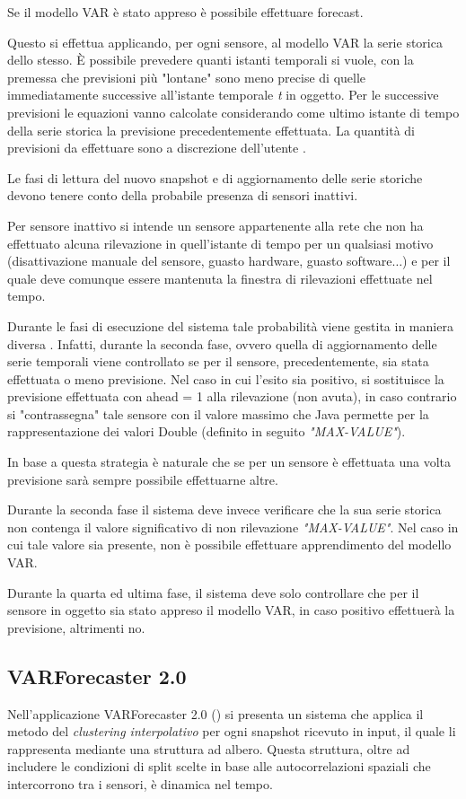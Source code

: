 \documentclass[12pt,a4paper,twoside,openright]{book}
\begin{document}
Se il modello VAR è stato appreso è possibile effettuare forecast.

Questo si effettua applicando, per ogni sensore, al modello VAR la serie storica dello stesso. È possibile prevedere quanti istanti temporali si vuole, con la premessa che previsioni più "lontane" sono meno precise di quelle immediatamente successive all'istante temporale \textit{t} in oggetto. Per le successive previsioni le equazioni vanno calcolate considerando come ultimo istante di tempo della serie storica la previsione precedentemente effettuata. La quantità di previsioni da effettuare sono a discrezione dell'utente \cite{donato}.

Le fasi di lettura del nuovo snapshot e di aggiornamento delle serie storiche devono tenere conto della probabile presenza di sensori inattivi. 

Per sensore inattivo \cite{donato} si intende un sensore appartenente alla rete che non ha effettuato alcuna rilevazione in quell'istante di tempo per un qualsiasi motivo (disattivazione manuale del sensore, guasto hardware, guasto software$\dots$) e per il quale deve comunque essere mantenuta la finestra di rilevazioni effettuate nel tempo. 

Durante le fasi di esecuzione del sistema tale probabilità viene gestita in maniera diversa \cite{donato}. Infatti, durante la seconda fase, ovvero quella di aggiornamento delle serie temporali viene controllato se per il sensore, precedentemente, sia stata effettuata o meno previsione. Nel caso in cui l'esito sia positivo, si sostituisce la previsione effettuata con ahead = 1 alla rilevazione (non avuta), in caso contrario si "contrassegna" tale sensore con il valore massimo che Java permette per la rappresentazione dei valori Double (definito in seguito \textit{"MAX-VALUE"}). 

In base a questa strategia è naturale che se per un sensore è effettuata una volta previsione sarà sempre possibile effettuarne altre. 

Durante la seconda fase il sistema deve invece verificare che la sua serie storica non contenga il valore significativo di non rilevazione \textit{"MAX-VALUE"}. Nel caso in cui tale valore sia presente, non è possibile effettuare apprendimento del modello VAR. 

Durante la quarta ed ultima fase, il sistema deve solo controllare che per il sensore in oggetto sia stato appreso il modello VAR, in caso positivo effettuerà la previsione, altrimenti no.
\subsection{VARForecaster 2.0}
Nell'applicazione VARForecaster 2.0 (\cite{donato}) si presenta un sistema che applica il metodo del \textit{clustering interpolativo} per ogni snapshot ricevuto in input, il quale li rappresenta mediante una struttura ad albero. Questa struttura, oltre ad includere le condizioni di split scelte in base alle autocorrelazioni spaziali che intercorrono tra i sensori, è dinamica nel tempo. 
\end{document}
